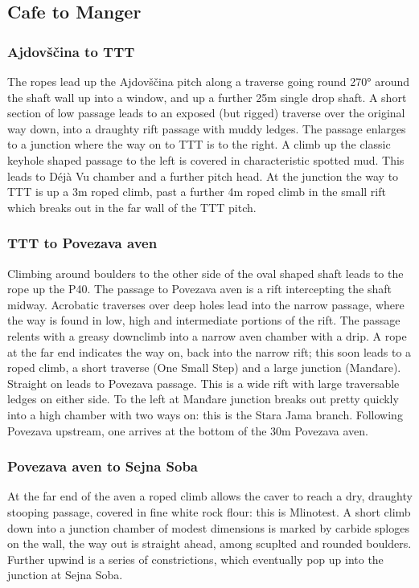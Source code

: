 \hypertarget{cafe-to-manger}{%
\subsection{Cafe to Manger}\label{cafe-to-manger}}

\hypertarget{ajdovux161ux10dina-to-ttt}{%
\subsubsection{Ajdovščina to TTT}\label{ajdovux161ux10dina-to-ttt}}

The ropes lead up the Ajdovščina pitch along a traverse going round 270° around the shaft wall up into a window, and up a further 25m single drop shaft. A short section of low passage leads to an exposed (but rigged) traverse over the original way down, into a draughty rift passage with muddy ledges. The passage enlarges to a junction where the way on to TTT is to the right. A climb up the classic keyhole shaped passage to the left is covered in characteristic spotted mud. This leads to Déjà Vu chamber and a further pitch head. At the junction the way to TTT is up a 3m roped climb, past a further 4m roped climb in the small rift which breaks out in the far wall of the TTT pitch.


\hypertarget{ttt-to-povezava-aven}{%
\subsubsection{TTT to Povezava aven}\label{ttt-to-povezava-aven}}

Climbing around boulders to the other side of the oval shaped shaft leads to the rope up the P40. The passage to Povezava aven is a rift intercepting the shaft midway. Acrobatic traverses over deep holes lead into the narrow passage, where the way is found in low, high and intermediate portions of the rift. The passage relents with a greasy downclimb into a narrow aven chamber with a drip. A rope at the far end indicates the way on, back into the narrow rift; this soon leads to a roped climb, a short traverse (One Small Step) and a large junction (Manđare). Straight on leads to Povezava passage. This is a wide rift with large traversable ledges on either side. To the left at Manđare junction breaks out pretty quickly into a high chamber with two ways on: this is the Stara Jama branch. Following Povezava upstream, one arrives at the bottom of the 30m Povezava aven.

\hypertarget{povezava-aven-to-sejna-soba}{%
\subsubsection{Povezava aven to Sejna Soba}\label{povezava-aven-to-sejna-soba}}

At the far end of the aven a roped climb allows the caver to reach a dry, draughty stooping passage, covered in fine white rock flour: this is Mlinotest. A short climb down into a junction chamber of modest dimensions is marked by carbide sploges on the wall, the way out is straight ahead, among scuplted and rounded boulders. Further upwind is a series of constrictions, which eventually pop up into the junction at Sejna Soba.

